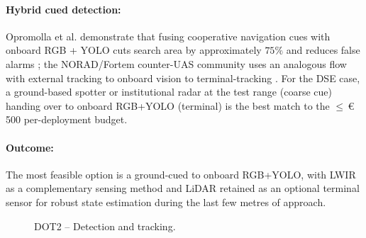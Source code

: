 \paragraph{Hybrid cued detection:} Opromolla et al. demonstrate that fusing cooperative navigation cues with onboard RGB + YOLO cuts search area by approximately $75\%$ and reduces false alarms \cite{Opromolla2019AirborneLearning}; the NORAD/Fortem counter-UAS community uses an analogous flow with external tracking to onboard vision to terminal-tracking \cite{Fortem}. For the DSE case, a ground-based spotter or institutional radar at the test range (coarse cue) handing over to onboard RGB+YOLO (terminal) is the best match to the $\leq$\,\euro\, 500 per-deployment budget.

\paragraph{Outcome:} The most feasible option is a ground-cued to onboard RGB+YOLO, with LWIR as a complementary sensing method and LiDAR retained as an optional terminal sensor for robust state estimation during the last few metres of approach.

\begin{figure}[H]
\centering
{}
\caption{DOT2 -- Detection and tracking.}
\label{fig:dot_sensing}
\end{figure}

